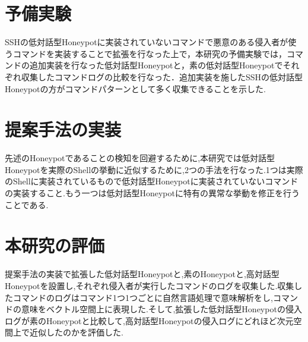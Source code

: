  \section{予備実験}
 \label{intr:prex}
 SSHの低対話型Honeypotに実装されていないコマンドで悪意のある侵入者が使うコマンドを実装することで拡張を行なった上で，本研究の予備実験では，コマンドの追加実装を行なった低対話型Honeypotと，素の低対話型Honeypotでそれぞれ収集したコマンドログの比較を行なった．追加実装を施したSSHの低対話型Honeypotの方がコマンドパターンとして多く収集できることを示した.

 \section{提案手法の実装}
 \label{intr:impl}
 先述のHoneypotであることの検知を回避するために,本研究では低対話型Honeypotを実際のShellの挙動に近似するために,2つの手法を行なった.1つは実際のShellに実装されているもので低対話型Honeypotに実装されていないコマンドの実装すること.もう一つは低対話型Honeypotに特有の異常な挙動を修正を行うことである.

 \section{本研究の評価}
 \label{intr:eval}
 提案手法の実装で拡張した低対話型Honeypotと,素のHoneypotと,高対話型Honeypotを設置し,それぞれ侵入者が実行したコマンドのログを収集した.収集したコマンドのログはコマンド1つ1つごとに自然言語処理で意味解析をし,コマンドの意味をベクトル空間上に表現した.そして,拡張した低対話型Honeypotの侵入ログが素のHoneypotと比較して,高対話型Honeypotの侵入ログにどれほど次元空間上で近似したのかを評価した.






